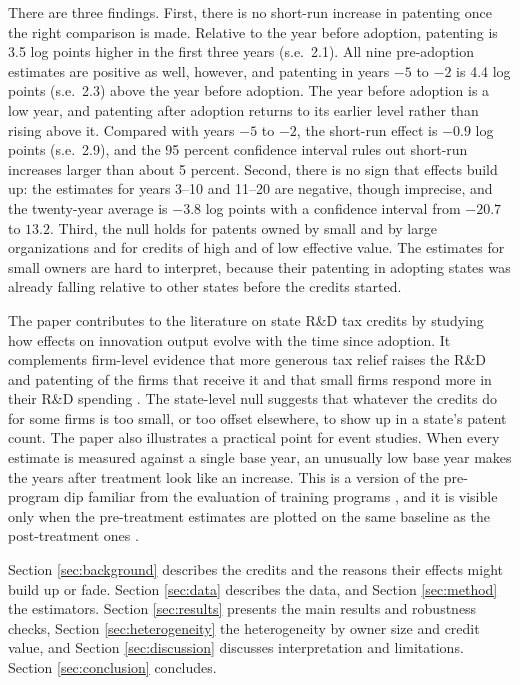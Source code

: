 \documentclass[12pt]{article}
\begin{document}
There are three findings. First, there is no short-run increase in patenting once the right comparison is
made. Relative to the year before adoption, patenting is 3.5 log points higher in the first three years
(s.e.\ 2.1). All nine pre-adoption estimates are positive as well, however, and patenting in years $-5$ to $-2$
is 4.4 log points (s.e.\ 2.3) above the year before adoption. The year before adoption is a low year, and
patenting after adoption returns to its earlier level rather than rising above it. Compared with years $-5$ to
$-2$, the short-run effect is $-0.9$ log points (s.e.\ 2.9), and the 95 percent confidence interval rules out
short-run increases larger than about 5 percent. Second, there is no sign that effects build up: the estimates
for years 3--10 and 11--20 are negative, though imprecise, and the twenty-year average is $-3.8$ log points
with a confidence interval from $-20.7$ to $13.2$. Third, the null holds for patents owned by small and by
large organizations and for credits of high and of low effective value. The estimates for small owners are
hard to interpret, because their patenting in adopting states was already falling relative to other states
before the credits started.

The paper contributes to the literature on state R\&D tax credits
\citep{wilson2009beggar,moretti2014state,chang2018endogeneity,melnik2024rd} by studying how effects on
innovation output evolve with the time since adoption. It complements firm-level evidence that more generous tax
relief raises the R\&D and patenting of the firms that receive it \citep{dechezlepretre2023tax} and that small firms respond
more in their R\&D spending \citep{agrawal2020small,rao2026tax}. The state-level null suggests that whatever
the credits do for some firms is too small, or too offset elsewhere, to show up in a state's patent count.
The paper also illustrates a practical point for event studies. When every estimate is measured against a
single base year, an unusually low base year makes the years after treatment look like an increase. This is a
version of the pre-program dip familiar from the evaluation of training programs \citep{ashenfelter1978estimating},
and it is visible only when the pre-treatment estimates are plotted on the same baseline as the post-treatment
ones \citep{roth2024interpreting}.

Section \ref{sec:background} describes the credits and the reasons their effects might build up or fade.
Section \ref{sec:data} describes the data, and Section \ref{sec:method} the estimators. Section
\ref{sec:results} presents the main results and robustness checks, Section \ref{sec:heterogeneity} the
heterogeneity by owner size and credit value, and Section \ref{sec:discussion} discusses interpretation and
limitations. Section \ref{sec:conclusion} concludes.
\end{document}
